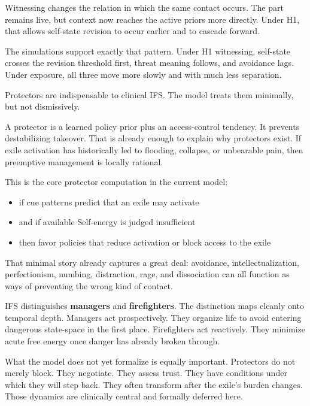 \documentclass[11pt,a4paper]{article}
\makeatletter
\providecommand{\tightlist}{%
  \setlength{\itemsep}{0pt}\setlength{\parskip}{0pt}}
\renewcommand\section{\@startsection{section}{1}{0pt}{2.3ex plus 0.6ex minus 0.2ex}{1.1ex plus 0.2ex}{\large\bfseries}}
\makeatother
\begin{document}
Witnessing changes the relation in which the same contact occurs. The
part remains live, but context now reaches the active priors more
directly. Under H1, that allows self-state revision to occur earlier and
to cascade forward.

The simulations support exactly that pattern. Under H1 witnessing,
self-state crosses the revision threshold first, threat meaning follows,
and avoidance lags. Under exposure, all three move more slowly and with
much less separation.

\section{Protectors}\label{protectors}

Protectors are indispensable to clinical IFS. The model treats them
minimally, but not dismissively.

A protector is a learned policy prior plus an access-control tendency.
It prevents destabilizing takeover. That is already enough to explain
why protectors exist. If exile activation has historically led to
flooding, collapse, or unbearable pain, then preemptive management is
locally rational.

This is the core protector computation in the current model:

\begin{itemize}
\tightlist
\item
  if cue patterns predict that an exile may activate
\item
  and if available Self-energy is judged insufficient
\item
  then favor policies that reduce activation or block access to the
  exile
\end{itemize}

That minimal story already captures a great deal: avoidance,
intellectualization, perfectionism, numbing, distraction, rage, and
dissociation can all function as ways of preventing the wrong kind of
contact.

IFS distinguishes \textbf{managers} and \textbf{firefighters}. The
distinction maps cleanly onto temporal depth. Managers act
prospectively. They organize life to avoid entering dangerous
state-space in the first place. Firefighters act reactively. They
minimize acute free energy once danger has already broken through.

What the model does not yet formalize is equally important. Protectors
do not merely block. They negotiate. They assess trust. They have
conditions under which they will step back. They often transform after
the exile's burden changes. Those dynamics are clinically central and
formally deferred here.
\end{document}
